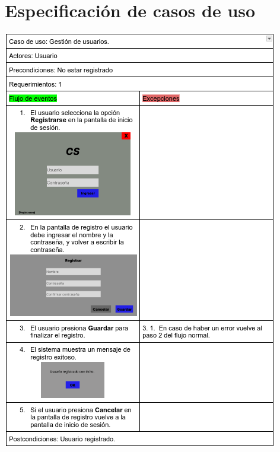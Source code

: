 \documentclass{article}
\begin{document}
\section{Especificación de casos de uso}
	\includegraphics[width=1\linewidth]{imagenes/especificacion_usuario.png}
	
\end{document}
